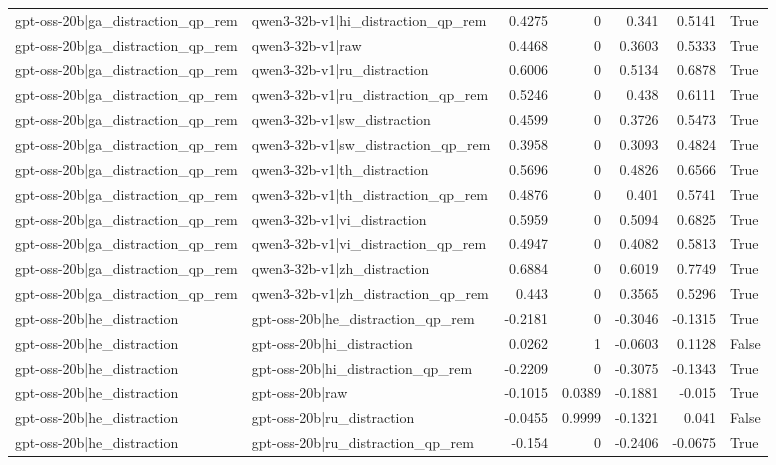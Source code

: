 \begin{table}
\begin{tabular}{l l r r r r l}
gpt-oss-20b|ga_distraction_qp_rem & qwen3-32b-v1|hi_distraction_qp_rem & 0.4275 & 0 & 0.341 & 0.5141 & True \\
gpt-oss-20b|ga_distraction_qp_rem & qwen3-32b-v1|raw & 0.4468 & 0 & 0.3603 & 0.5333 & True \\
gpt-oss-20b|ga_distraction_qp_rem & qwen3-32b-v1|ru_distraction & 0.6006 & 0 & 0.5134 & 0.6878 & True \\
gpt-oss-20b|ga_distraction_qp_rem & qwen3-32b-v1|ru_distraction_qp_rem & 0.5246 & 0 & 0.438 & 0.6111 & True \\
gpt-oss-20b|ga_distraction_qp_rem & qwen3-32b-v1|sw_distraction & 0.4599 & 0 & 0.3726 & 0.5473 & True \\
gpt-oss-20b|ga_distraction_qp_rem & qwen3-32b-v1|sw_distraction_qp_rem & 0.3958 & 0 & 0.3093 & 0.4824 & True \\
gpt-oss-20b|ga_distraction_qp_rem & qwen3-32b-v1|th_distraction & 0.5696 & 0 & 0.4826 & 0.6566 & True \\
gpt-oss-20b|ga_distraction_qp_rem & qwen3-32b-v1|th_distraction_qp_rem & 0.4876 & 0 & 0.401 & 0.5741 & True \\
gpt-oss-20b|ga_distraction_qp_rem & qwen3-32b-v1|vi_distraction & 0.5959 & 0 & 0.5094 & 0.6825 & True \\
gpt-oss-20b|ga_distraction_qp_rem & qwen3-32b-v1|vi_distraction_qp_rem & 0.4947 & 0 & 0.4082 & 0.5813 & True \\
gpt-oss-20b|ga_distraction_qp_rem & qwen3-32b-v1|zh_distraction & 0.6884 & 0 & 0.6019 & 0.7749 & True \\
gpt-oss-20b|ga_distraction_qp_rem & qwen3-32b-v1|zh_distraction_qp_rem & 0.443 & 0 & 0.3565 & 0.5296 & True \\
gpt-oss-20b|he_distraction & gpt-oss-20b|he_distraction_qp_rem & -0.2181 & 0 & -0.3046 & -0.1315 & True \\
gpt-oss-20b|he_distraction & gpt-oss-20b|hi_distraction & 0.0262 & 1 & -0.0603 & 0.1128 & False \\
gpt-oss-20b|he_distraction & gpt-oss-20b|hi_distraction_qp_rem & -0.2209 & 0 & -0.3075 & -0.1343 & True \\
gpt-oss-20b|he_distraction & gpt-oss-20b|raw & -0.1015 & 0.0389 & -0.1881 & -0.015 & True \\
gpt-oss-20b|he_distraction & gpt-oss-20b|ru_distraction & -0.0455 & 0.9999 & -0.1321 & 0.041 & False \\
gpt-oss-20b|he_distraction & gpt-oss-20b|ru_distraction_qp_rem & -0.154 & 0 & -0.2406 & -0.0675 & True \\

\end{tabular}
\end{table}
